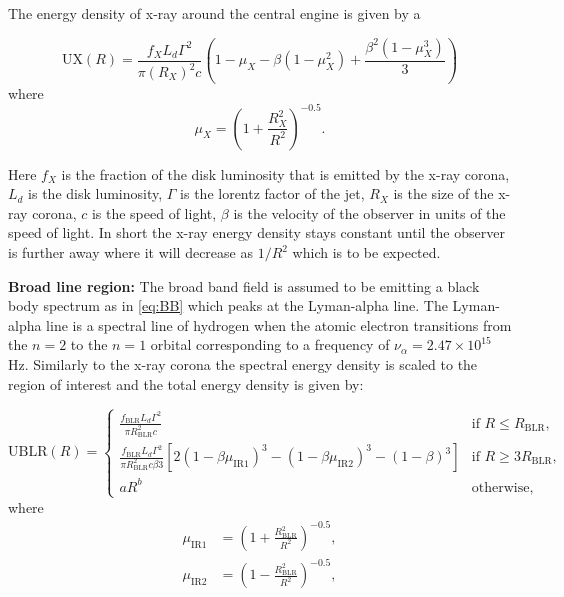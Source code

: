 The energy density of x-ray around the central engine is given by a 

\begin{equation}
    \text{UX}(R) = \frac{f_{X} L_{d} \Gamma^2}{\pi (R_{X})^2 c} \left(1 - \mu_{X} - \beta(1 - \mu_{X}^2) + \frac{\beta^2 (1 - \mu_{X}^3)}{3}\right)
\end{equation}
where
\[
\mu_{X} = \left(1 + \frac{R_{X}^2}{R^2}\right)^{-0.5}.
\]

Here $f_{X}$ is the fraction of the disk luminosity that is emitted by the x-ray corona, $L_{d}$ is the disk luminosity, $\Gamma$ is the lorentz factor of the jet, $R_{X}$ is the size of the x-ray corona, $c$ is the speed of light, $\beta$ is the velocity of the observer in units of the speed of light.
In short the x-ray energy density stays constant until the observer is further away where it will decrease as $1/R^2$ which is to be expected.



\textbf{Broad line region:} The broad band field is assumed to be emitting a black body spectrum as in \ref*{eq:BB} which peaks at the Lyman-alpha line. The Lyman-alpha line is a spectral line of hydrogen  when the atomic electron transitions from the $n=2$ to the $n=1$ orbital corresponding to a frequency of $\nu_{\alpha} = 2.47 \times 10^{15}$ Hz. 
Similarly to the x-ray corona the spectral energy density is scaled to the region of interest and the total energy density is given by: 


\begin{equation}
    \label{eq:UBLR}
    \text{UBLR}(R) = 
    \begin{cases}
    \frac{f_{\text{BLR}} L_{d} \Gamma^2}{\pi R_{\text{BLR}}^2 c} & \text{if } R \leq R_{\text{BLR}}, \\
    \frac{f_{\text{BLR}} L_{d} \Gamma^2}{\pi R_{\text{BLR}}^2 c \beta 3} \left[2 (1 - \beta \mu_{\text{IR1}})^3 - (1 - \beta \mu_{\text{IR2}})^3 - (1 - \beta)^3\right] & \text{if } R \geq 3R_{\text{BLR}}, \\
    a R^b & \text{otherwise},
    \end{cases}  
\end{equation}
where 
\begin{align*}
    \mu_{\text{IR1}} &= \left(1 + \frac{R_{\text{BLR}}^2}{R^2}\right)^{-0.5}, \\
    \mu_{\text{IR2}} &= \left(1 - \frac{R_{\text{BLR}}^2}{R^2}\right)^{-0.5}, \\
\end{align*}


